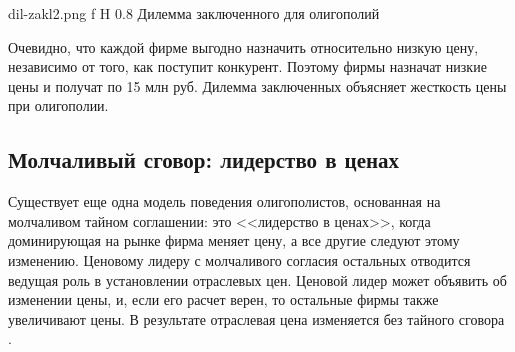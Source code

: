 {dil-zakl2.png}
{f}
{H}
{0.8\textwidth}
{Дилемма заключенного для олигополий}

Очевидно, что каждой фирме выгодно назначить относительно низкую цену, независимо от того, как поступит конкурент. 
Поэтому фирмы назначат низкие цены и получат по 15 млн руб. 
Дилемма заключенных объясняет жесткость цены при олигополии.


\subsection{Молчаливый сговор: лидерство в ценах}

Существует еще одна модель поведения олигополистов, основанная на молчаливом тайном соглашении: это <<лидерство в ценах>>, когда доминирующая на рынке фирма меняет цену,
а все другие следуют этому изменению. 
Ценовому лидеру с молчаливого согласия остальных отводится ведущая роль в установлении отраслевых цен. 
Ценовой лидер может объявить об изменении цены, и, если его расчет верен, то остальные фирмы также увеличивают цены. 
В результате отраслевая цена изменяется без тайного сговора \cite{info_oly3}. 